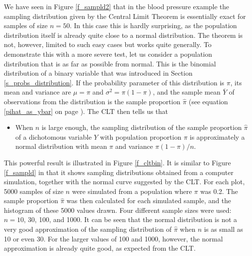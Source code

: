 We have seen in Figure \ref{f_sampld2} that in the blood pressure
example the sampling distribution given by the Central Limit Theorem is
essentially exact for samples of size $n=50$. In this case this is
hardly surprising, as the population distribution itself is already
quite close to a normal distribution. The theorem is not, however,
limited to such easy cases but works quite generally. To demonstrate
this with a more severe test, let us consider a population distribution
that is as far as possible from normal. This is the binomial
distribution of a binary variable that was introduced in Section
\ref{s_probs_distribution}. If the probability parameter of this
distribution is $\pi$, its mean and variance are $\mu=\pi$ and
$\sigma^{2}=\pi(1-\pi)$, and the sample mean $\bar{Y}$ of observations from
the distribution is the sample
proportion $\hat{\pi}$ (see
equation
\ref{pihat_as_ybar} on page
\pageref{pihat_as_ybar}).
The CLT then tells us that
\begin{itemize}
\item
When $n$ is large enough, the sampling distribution of
the sample proportion
$\hat{\pi}$ of a dichotomous variable $Y$ with population
proportion $\pi$ is approximately a normal distribution with mean $\pi$
and  variance $\pi(1-\pi)/n$.
\end{itemize}
This powerful result is illustrated in Figure \ref{f_cltbin}. It is
similar to Figure \ref{f_sampld}
in that it shows sampling distributions
obtained from a computer simulation, together with the normal curve
suggested by the CLT. For each plot, 5000 samples of size $n$ were
simulated from a population where $\pi$ was 0.2. The sample
proportion $\hat{\pi}$ was then calculated for each simulated sample,
and the histogram of these 5000 values drawn. Four different sample
sizes were used: $n=10$, 30, 100, and 1000. It can be seen that
the normal distribution is not a very good approximation of
the sampling distribution of $\hat{\pi}$ when $n$ is as small as 10 or
even 30. For the larger values of 100 and 1000, however, the normal
approximation is already quite good, as expected from the CLT.

